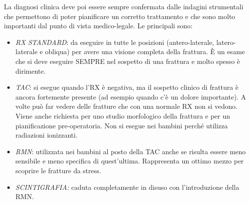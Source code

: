 La diagnosi clinica deve poi essere sempre confermata dalle indagini strumentali che permettono di poter pianificare un corretto trattamento e che sono molto importanti dal punto di vista medico-legale. Le principali sono:

\begin{itemize}
\item
  \emph{RX STANDARD}: da eseguire in tutte le posizioni (antero-laterale, latero-laterale e obliqua) per avere una visione completa della frattura. È un esame che si deve eseguire SEMPRE nel sospetto di una frattura e molto spesso è dirimente.
\item
  \emph{TAC}: si esegue quando l'RX è negativa, ma il sospetto clinico di frattura è ancora fortemente presente (ad esempio quando c'è un dolore importante). A volte può far vedere delle fratture che con una normale RX non si vedono.
Viene anche richiesta per uno studio morfologico della frattura e per un pianificazione pre-operatoria.
Non si esegue nei bambini perché utilizza radiazioni ionizzanti.
\item
  \emph{RMN}: utilizzata nei bambini al posto della TAC anche se risulta essere meno sensibile e meno specifica di quest'ultima. Rappresenta un ottimo mezzo per scoprire le fratture da stress.
\item
  \emph{SCINTIGRAFIA:} caduta completamente in disuso con l'introduzione della RMN.
\end{itemize}

